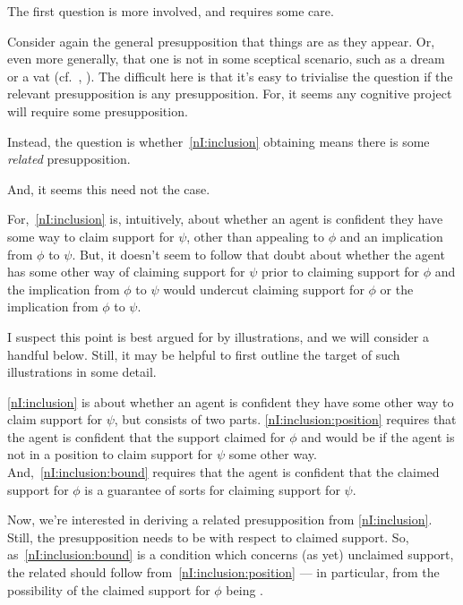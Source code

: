 \begin{note}
  The first question is more involved, and requires some care.

  Consider again the general presupposition that things are as they appear.
  Or, even more generally, that one is not in some sceptical scenario, such as a dream or a vat (cf.~\Citeyear{Wright:2002uk}, \Citeyear[97--98]{Wright:2011wn}).
  The difficult here is that it's easy to trivialise the question if the relevant presupposition is any presupposition.
  For, it seems any cognitive project will require some presupposition.

  Instead, the question is whether~\ref{nI:inclusion} obtaining means there is some \emph{related} presupposition.

  And, it seems this need not the case.

  For,~\ref{nI:inclusion} is, intuitively, about whether an agent is confident they have some way to claim support for \(\psi\), other than appealing to \(\phi\) and an implication from \(\phi\) to \(\psi\).
  But, it doesn't seem to follow that doubt about whether the agent has some other way of claiming support for \(\psi\) prior to claiming support for \(\phi\) and the implication from \(\phi\) to \(\psi\) would undercut claiming support for \(\phi\) or the implication from \(\phi\) to \(\psi\).

  I suspect this point is best argued for by illustrations, and we will consider a handful below.
  Still, it may be helpful to first outline the target of such illustrations in some detail.

  \ref{nI:inclusion} is about whether an agent is confident they have some other way to claim support for \(\psi\), but consists of two parts.
  \ref{nI:inclusion:position} requires that the agent is confident that the support claimed for \(\phi\) and would be \mom{} if the agent is not in a position to claim support for \(\psi\) some other way.
  And,~\ref{nI:inclusion:bound} requires that the agent is confident that the claimed support for \(\phi\) is a guarantee of sorts for claiming support for \(\psi\).

  Now, we're interested in deriving a related presupposition from \ref{nI:inclusion}.
  Still, the presupposition needs to be with respect to claimed support.
  So, as~\ref{nI:inclusion:bound} is a condition which concerns (as yet) unclaimed support, the related should follow from~\ref{nI:inclusion:position} --- in particular, from the possibility of the claimed support for \(\phi\) being \mom{}.


\end{note}
